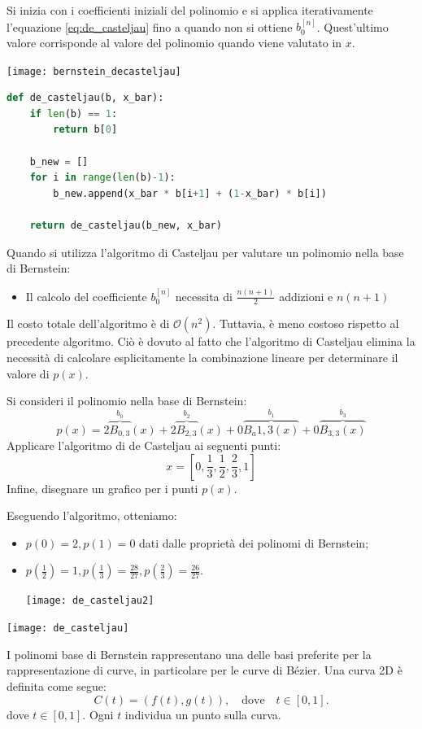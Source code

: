 \documentclass{article}
\begin{document}
Si inizia con i coefficienti iniziali del polinomio e si applica
iterativamente l'equazione \ref{eq:de_casteljau} fino a quando non si ottiene
$b_{0}^{[n]}$. Quest'ultimo valore corrisponde al valore del polinomio quando
viene valutato in $x$.
\begin{center}
    \texttt{[image: bernstein\_decasteljau]}
\end{center}
\begin{lstlisting}[language=Python]
def de_casteljau(b, x_bar):
    if len(b) == 1:
        return b[0]
    
    b_new = []
    for i in range(len(b)-1):
        b_new.append(x_bar * b[i+1] + (1-x_bar) * b[i])
    
    return de_casteljau(b_new, x_bar)
\end{lstlisting}
Quando si utilizza l'algoritmo di Casteljau per valutare un polinomio nella
base di Bernstein:
\begin{itemize}
    \item Il calcolo del coefficiente $b_{0}^{[n]}$ necessita di $\frac{n(n+1)}{2}$
    addizioni e $n(n+1)$
\end{itemize}
Il costo totale dell'algoritmo è di $\mathcal{O}(n^2)$. Tuttavia, è meno
costoso rispetto al precedente algoritmo. Ciò è dovuto al fatto che
l'algoritmo di Casteljau elimina la necessità di calcolare esplicitamente la
combinazione lineare per determinare il valore di $p(x)$.
\begin{example}
    Si consideri il polinomio nella base di Bernstein:
    $$p(x)=2\overbrace{B_{0,3}}^{b_0}(x)+2\overbrace{B_{2,3}}^{b_2}(x)+0\overbrace{B_a{1,3}(x)}^{b_1}+0\overbrace{B_{3,3}(x)}^{b_3}$$
    Applicare l'algoritmo di de Casteljau ai seguenti punti: 
    $$x=\left[0, \frac{1}{3},\frac{1}{2}, \frac{2}{3}, 1\right]$$
    Infine, disegnare un grafico per i punti $p(x)$.
    
    Eseguendo l'algoritmo, otteniamo:
    \begin{itemize}
       \item$p(0)=2, p(1)=0$ dati dalle proprietà dei polinomi di Bernstein;
       \item $p(\frac{1}{2})=1, p(\frac{1}{3})=\frac{28}{27},
       p(\frac{2}{3})=\frac{26}{27}$.

       \begin{center}
           \texttt{[image: de\_casteljau2]}
       \end{center}
    \end{itemize}

    \begin{center}
        \texttt{[image: de\_casteljau]}
    \end{center}
\end{example}
I polinomi base di Bernstein rappresentano una delle basi preferite per la
rappresentazione di curve, in particolare per le curve di Bézier.
Una curva 2D è definita come segue:
\[
C(t) = \left( f(t), g(t) \right), \quad \text{dove} \quad t \in [0,1].
\]
dove \( t \in [0,1] \). Ogni \( t \) individua un punto sulla curva.
\end{document}
